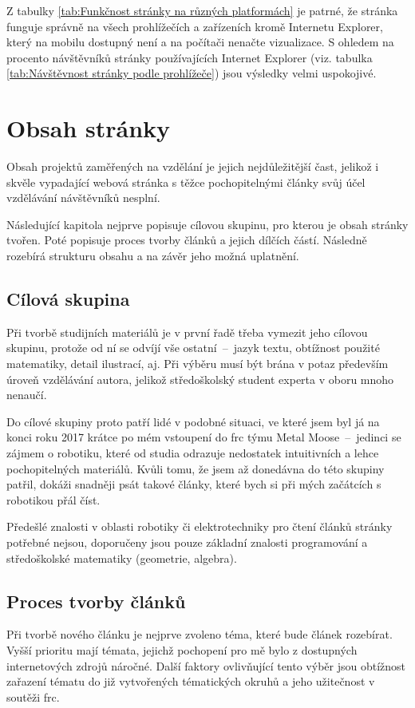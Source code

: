\documentclass[a4paper, 12pt]{article}
\begin{document}
  Z tabulky \ref{tab:Funkčnost stránky na různých platformách} je patrné, že stránka funguje správně na všech prohlížečích a zařízeních kromě Internetu Explorer, který na mobilu dostupný není a na počítači nenačte vizualizace. S ohledem na procento návštěvníků stránky používajících Internet Explorer (viz. tabulka \ref{tab:Návštěvnost stránky podle prohlížeče}) jsou výsledky velmi uspokojivé.


  \section{Obsah stránky}
  Obsah projektů zaměřených na vzdělání je jejich nejdůležitější čast, jelikož i skvěle vypadající webová stránka s těžce pochopitelnými články svůj účel vzdělávání návštěvníků nesplní.

  Následující kapitola nejprve popisuje cílovou skupinu, pro kterou je obsah stránky tvořen. Poté popisuje proces tvorby článků a jejich dílčích částí. Následně rozebírá strukturu obsahu a na závěr jeho možná uplatnění.


  \subsection{Cílová skupina}
  Při tvorbě studijních materiálů je v první řadě třeba vymezit jeho cílovou skupinu, protože od ní se odvíjí vše ostatní~--~jazyk textu, obtížnost použité matematiky, detail ilustrací, aj. Při výběru musí být brána v potaz především úroveň vzdělávání autora, jelikož středoškolský student experta v oboru mnoho nenaučí.

  Do cílové skupiny proto patří lidé v podobné situaci, ve které jsem byl já na konci roku 2017 krátce po mém vstoupení do \gls{frc} týmu Metal Moose~--~jedinci se zájmem o robotiku, které od studia odrazuje nedostatek intuitivních a lehce pochopitelných materiálů. Kvůli tomu, že jsem až donedávna do této skupiny patřil, dokáži snadněji psát takové články, které bych si při mých začátcích s robotikou přál číst.

  Předešlé znalosti v oblasti robotiky či elektrotechniky pro čtení článků stránky potřebné nejsou, doporučeny jsou pouze základní znalosti programování a středoškolské matematiky (geometrie, algebra).


  \subsection{Proces tvorby článků} \label{sec:Proces tvorby článků}
  Při tvorbě nového článku je nejprve zvoleno téma, které bude článek rozebírat. Vyšší prioritu mají témata, jejichž pochopení pro mě bylo z dostupných internetových zdrojů náročné. Další faktory ovlivňující tento výběr jsou obtížnost zařazení tématu do již vytvořených tématických okruhů a jeho užitečnost v soutěži \gls{frc}.
\end{document}
